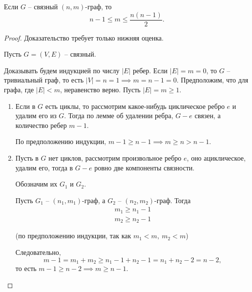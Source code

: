 \begin{theorem}
    Если $ G $ -- связный $ (n,m) $-граф, то
    \[
        n-1 \leqslant m \leqslant \frac{n(n-1)}{2}.
    \]
\end{theorem}

\begin{proof}
    Доказательство требует только нижняя оценка.

    Пусть $ G=(V,E) $ -- связный.

    Доказывать будем индукцией по числу $ | E | $ ребер. Если $ | E | = m =0 $, то $ G $ -- тривиальный граф, то есть $ | V | =n = 1 \implies m = n-1 = 0 $. Предположим, что для графа, где $ | E | < m $, неравенство верно. Пусть $ | E | = m \geqslant 1 $.
    \begin{enumerate}
        \item Если в $ G $ есть циклы, то рассмотрим какое-нибудь циклическое ребро $ e $ и удалим его из $ G $. Тогда по лемме об удалении ребра, $ G-e $ связен, а количество ребер $ m-1 $.

              По предположению индукции, $ m-1 \geqslant n-1 \implies m \geqslant n > n-1 $.
        \item Пусть в $ G $ нет циклов, рассмотрим произвольное ребро $ e $, оно ациклическое, удалим его, тогда в $ G - e $ ровно две компоненты связности.

              Обозначим их $ G_1 $ и $ G_2 $.
              \begin{figure}[H]
                  \centering
                  \label{fig:fig_22}
              \end{figure}

              Пусть $ G_1 $ -- $ (n_1,m_1) $-граф, а $ G_2 $ -- $ (n_2,m_2) $-граф. Тогда
              \[
                  \begin{array}{l}
                      m_1 \geqslant n_1 - 1 \\
                      m_2 \geqslant n_2-1
                  \end{array}
              \]
              \begin{center}
                  (по предположению индукции, так как $ m_1<m, \ m_2<m $)
              \end{center}

              Следовательно,
              \[
                  m-1 = m_1 + m_2 \geqslant n_1-1+n_2-1=n_1+n_2-2 = n-2,
              \]
              то есть $ m-1 \geqslant n-2 \implies m \geqslant n-1 $.
    \end{enumerate}
\end{proof}

